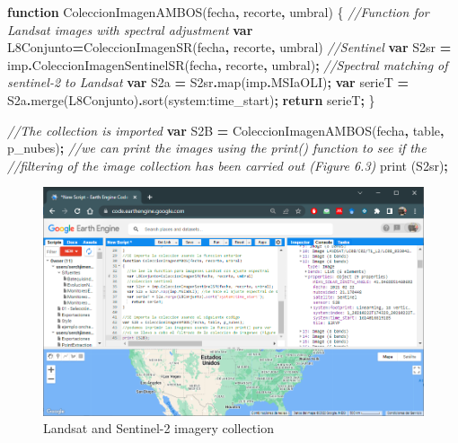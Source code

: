 \documentclass[
]{book}
\newenvironment{Shaded}{\begin{snugshade}}{\end{snugshade}}
\newcommand{\AttributeTok}[1]{\textcolor[rgb]{0.77,0.63,0.00}{#1}}
\newcommand{\CommentTok}[1]{\textcolor[rgb]{0.56,0.35,0.01}{\textit{#1}}}
\newcommand{\ControlFlowTok}[1]{\textcolor[rgb]{0.13,0.29,0.53}{\textbf{#1}}}
\newcommand{\FunctionTok}[1]{\textcolor[rgb]{0.00,0.00,0.00}{#1}}
\newcommand{\KeywordTok}[1]{\textcolor[rgb]{0.13,0.29,0.53}{\textbf{#1}}}
\newcommand{\NormalTok}[1]{#1}
\newcommand{\OperatorTok}[1]{\textcolor[rgb]{0.81,0.36,0.00}{\textbf{#1}}}
\newcommand{\StringTok}[1]{\textcolor[rgb]{0.31,0.60,0.02}{#1}}
\begin{document}
\begin{Shaded}
\begin{Highlighting}[]
\KeywordTok{function} \FunctionTok{ColeccionImagenAMBOS}\NormalTok{(fecha}\OperatorTok{,}\NormalTok{ recorte}\OperatorTok{,}\NormalTok{ umbral)}
\NormalTok{\{}
  \CommentTok{//Function for Landsat images with spectral adjustment}
  \KeywordTok{var}\NormalTok{ L8Conjunto}\OperatorTok{=}\FunctionTok{ColeccionImagenSR}\NormalTok{(fecha}\OperatorTok{,}\NormalTok{ recorte}\OperatorTok{,}\NormalTok{ umbral)}
  \CommentTok{//Sentinel}
  \KeywordTok{var}\NormalTok{ S2sr }\OperatorTok{=}\NormalTok{ imp}\OperatorTok{.}\FunctionTok{ColeccionImagenSentinelSR}\NormalTok{(fecha}\OperatorTok{,}\NormalTok{ recorte}\OperatorTok{,}\NormalTok{ umbral)}\OperatorTok{;}
  \CommentTok{//Spectral matching of sentinel{-}2 to Landsat}
  \KeywordTok{var}\NormalTok{ S2a }\OperatorTok{=}\NormalTok{ S2sr}\OperatorTok{.}\FunctionTok{map}\NormalTok{(imp}\OperatorTok{.}\AttributeTok{MSIaOLI}\NormalTok{)}\OperatorTok{;} 
  \KeywordTok{var}\NormalTok{ serieT }\OperatorTok{=}\NormalTok{ S2a}\OperatorTok{.}\FunctionTok{merge}\NormalTok{(L8Conjunto)}\OperatorTok{.}\FunctionTok{sort}\NormalTok{(}\StringTok{\textquotesingle{}system:time\_start\textquotesingle{}}\NormalTok{)}\OperatorTok{;}
    \ControlFlowTok{return}\NormalTok{ serieT}\OperatorTok{;}
\NormalTok{\}}

\CommentTok{//The collection is imported}
\KeywordTok{var}\NormalTok{ S2B }\OperatorTok{=} \FunctionTok{ColeccionImagenAMBOS}\NormalTok{(fecha}\OperatorTok{,}\NormalTok{ table}\OperatorTok{,}\NormalTok{ p\_nubes)}\OperatorTok{;}
\CommentTok{//we can print the images using the print() function to see if the }
\CommentTok{//filtering of the image collection has been carried out (Figure 6.3)}
\FunctionTok{print}\NormalTok{ (S2sr)}\OperatorTok{;}
\end{Highlighting}
\end{Shaded}

\begin{figure}

{\centering \includegraphics[width=0.85\linewidth]{./images/Figure72} 

}

\caption{Landsat and Sentinel-2 imagery collection}\label{fig:figV3}
\end{figure}
\end{document}
